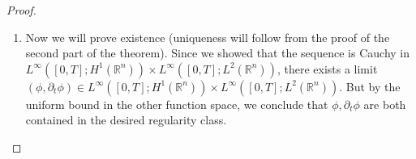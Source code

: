 \documentclass{article}
\begin{document}
\begin{proof}
\begin{enumerate}[itemsep =-2pt,label = (\arabic{*})]
\begin{enumerate}
\begin{equation*}
				\abs{\partial_{\alpha}((a^{\alpha\beta}(\phi^{(i - 1)}) - a^{\alpha\beta}(\phi^{(i - 2)}))\partial_{\beta}\phi^{(i - 1)})} \leq C|\partial(\phi^{(i-1)} - \phi^{(i - 2)})|, 
			\end{equation*} 
			which implies 
			\begin{equation*}
				\norm{\partial_{\alpha}((a^{\alpha\beta}(\phi^{(i - 1)}) - a^{\alpha\beta}(\phi^{(i - 2)}))\partial_{\beta}\phi^{(i - 1)})}_{L^{2}(\mathbb{R}^{n})}(t) \leq C\|\partial(\phi^{(i-1)} - \phi^{(i - 2)})\|_{L^{2}(\mathbb{R}^{n})}(t), 
			\end{equation*} 
			for all $t \in [0, T]$. Likewise, one has that 
			\begin{equation*}
				\norm{F(\phi^{(i -1)}, \partial\phi^{(i - 1)}) - F(\phi^{(i - 2)}, \partial \phi^{(i - 2)})}_{L^{2}(\mathbb{R}^{n})}(t) \leq C\|\partial(\phi^{(i-1)} - \phi^{(i - 2)})\|_{L^{2}(\mathbb{R}^{n})}(t), 
			\end{equation*} 
			and $\norm{\partial (a^{\alpha\beta}(\phi^{(i - 1)}))}_{L^{\infty}(\mathbb{R}^{n})} \leq C$. Thus applying (\ref{eq:cor49}), 
			we get 
			\begin{align*}
				&\sup_{t \in [0,T]} \|(\phi^{(i)} - \phi^{(i-1)}, \partial_t \phi^{(i)} - \partial_t \phi^{(i-1)})\|_{H^1(\mathbb{R}^n) \times L^2(\mathbb{R}^n)}(t) \\
				\le{} &CT \sup_{t \in [0,T]} \|(\phi^{(i-1)} - \phi^{(i-2)}, \partial_t \phi^{(i-1)} - \partial_t \phi^{(i-2)})\|_{H^1(\mathbb{R}^n) \times L^2(\mathbb{R}^n)}(t) \leq C_{1}.
			\end{align*}
			Thus if we choose $T > 0$ sufficiently small, then 
			\begin{equation*}
				\sup_{t \in [0, T]}\norm{\phi^{(i)} - \phi^{(i - 1)}}_{H^{1}(\mathbb{R}^{n})}(t) \leq \frac{1}{2}\sup_{t \in [0, T]}\norm{\phi^{(i)} - \phi^{(i - 2)}}_{H^{1}(\mathbb{R}^{n})}(t), 
			\end{equation*}
			whence 
			\begin{equation*}
				\sup_{t \in [0, T]}\norm{\phi^{(i)} - \phi^{(i -1)}}_{H^{1}(\mathbb{R}^{n})}(t) \leq 2^{2 - i}C_{1}, 
			\end{equation*} 
			so that the Cauchy property follows immediately. 
			\item Now we will prove existence (uniqueness will follow from the proof of the second part of the theorem). Since we showed that the sequence is Cauchy in $L^{\infty}([0,T]; H^{1}(\mathbb{R}^{n})) \times L^{\infty}([0,T]; L^{2}(\mathbb{R}^{n}))$, there exists a limit $(\phi, \partial_{t}\phi) \in L^{\infty}([0,T]; H^{1}(\mathbb{R}^{n})) \times L^{\infty}([0,T]; L^{2}(\mathbb{R}^{n}))$. But by the uniform bound in the other function space, we conclude that $\phi, \partial_{t}\phi$ are both contained in the desired regularity class. 

\end{enumerate}
\end{enumerate}
\end{proof}
\end{document}
